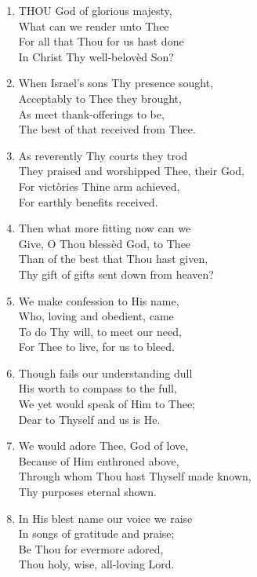 \documentclass[11pt,a4paper]{article}
\begin{document}
\begin{enumerate}
    \item THOU God of glorious majesty, \\
        What can we render unto Thee \\
        For all that Thou for us hast done \\
        In Christ Thy well-belov\`ed Son?

    \item When Israel's sons Thy presence sought, \\
        Acceptably to Thee they brought, \\
        As meet thank-offerings to be, \\
        The best of that received from Thee.

    \item As reverently Thy courts they trod \\
        They praised and worshipped Thee, their God, \\
        For vict\`ories Thine arm achieved, \\
        For earthly benefits received.

    \item Then what more fitting now can we \\
        Give, O Thou bless\`ed God, to Thee \\
        Than of the best that Thou hast given, \\
        Thy gift of gifts sent down from heaven?

    \item We make confession to His name, \\
        Who, loving and obedient, came \\
        To do Thy will, to meet our need, \\
        For Thee to live, for us to bleed.

    \item Though fails our understanding dull \\
        His worth to compass to the full, \\
        We yet would speak of Him to Thee; \\
        Dear to Thyself and us is He.

    \item We would adore Thee, God of love, \\
        Because of Him enthroned above, \\
        Through whom Thou hast Thyself made known, \\
        Thy purposes eternal shown.

    \item In His blest name our voice we raise \\
        In songs of gratitude and praise; \\
        Be Thou for evermore adored, \\
        Thou holy, wise, all-loving Lord.

\end{enumerate}
\end{document}
